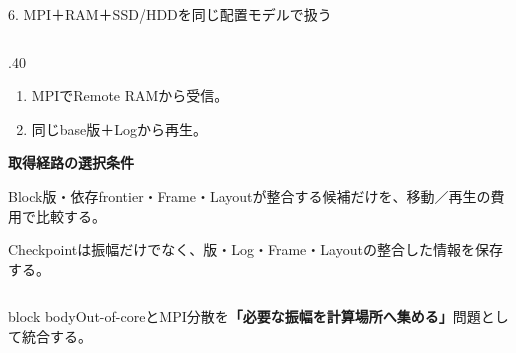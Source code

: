 \documentclass[aspectratio=169,10pt,hyperref={unicode,hidelinks}]{beamer}
\newcommand{\takeaway}[1]{\par\vspace{2mm}\begin{beamercolorbox}[wd=\textwidth,sep=1.5mm]{block body}\small #1\end{beamercolorbox}\par}
\newcommand{\smallnote}[1]{\par{\footnotesize\color{muted}#1\par}}
\begin{document}
\begin{frame}{6. MPI＋RAM＋SSD/HDDを同じ配置モデルで扱う}
\begin{columns}[T,onlytextwidth]
\begin{column}{.40\textwidth}
\begin{enumerate}
        \item MPIでRemote RAMから受信。
        \item 同じbase版＋Logから再生。
      \end{enumerate}
      \medskip
      \textbf{取得経路の選択条件}\par
      \small Block版・依存frontier・Frame・Layoutが整合する候補だけを、移動／再生の費用で比較する。
      \medskip
      \smallnote{Checkpointは振幅だけでなく、版・Log・Frame・Layoutの整合した情報を保存する。}
    \end{column}
  \end{columns}
  \takeaway{Out-of-coreとMPI分散を\textbf{「必要な振幅を計算場所へ集める」}問題として統合する。}
\end{frame}
\end{document}

